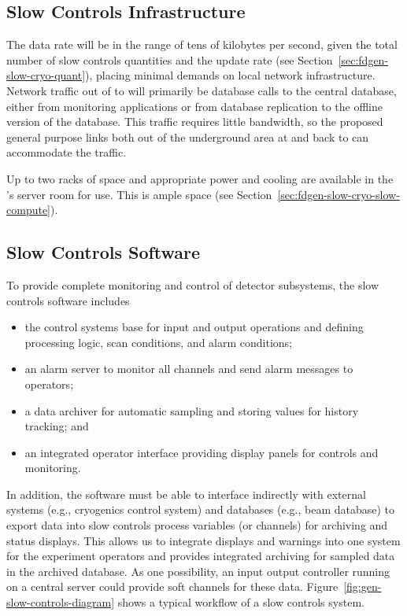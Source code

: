 \subsection{Slow Controls Infrastructure}
\label{sec:fdgen-slow-cryo-slow-infra}

The data rate will be in the range of tens of kilobytes per second, given the total number of slow controls quantities and the update rate  
(see Section~\ref{sec:fdgen-slow-cryo-quant}), placing minimal demands
on local network infrastructure.
Network traffic out of   to  will primarily be database calls
to the central  database, either from monitoring applications or from
database replication to the offline version of the  database.  This
traffic requires little bandwidth, so the proposed general purpose
links both out of the %
underground area at   and back to   can accommodate the traffic.

Up to two racks of space and appropriate power and cooling are
available in the 's  server room for  use. This is ample space (see Section~\ref{sec:fdgen-slow-cryo-slow-compute}).


\subsection{Slow Controls Software}
\label{sec:fdgen-slow-cryo-sw}


To provide complete monitoring and control of detector subsystems, the slow controls software includes
%
\begin{itemize}
 \item the control systems base for input and output operations
  and defining processing logic, scan conditions, and alarm conditions;
 \item an alarm server to monitor all channels and send alarm
  messages to operators;
 \item a data archiver for automatic sampling and storing values for history tracking; and 
 \item an integrated operator interface providing display panels for
  controls and monitoring.
\end{itemize}

In addition, the software must be able to 
interface indirectly with external systems (e.g., cryogenics control
system) and databases (e.g., beam database) to export data into
slow controls process variables (or channels) for archiving and status
displays. This allows us to integrate displays and warnings into one
system for the experiment operators and %
provides integrated
archiving for sampled data in the archived database. As one possibility, an input output controller running on a central 
server could provide soft channels for these data.
Figure~\ref{fig:gen-slow-controls-diagram} shows a typical workflow of a
slow controls system.

